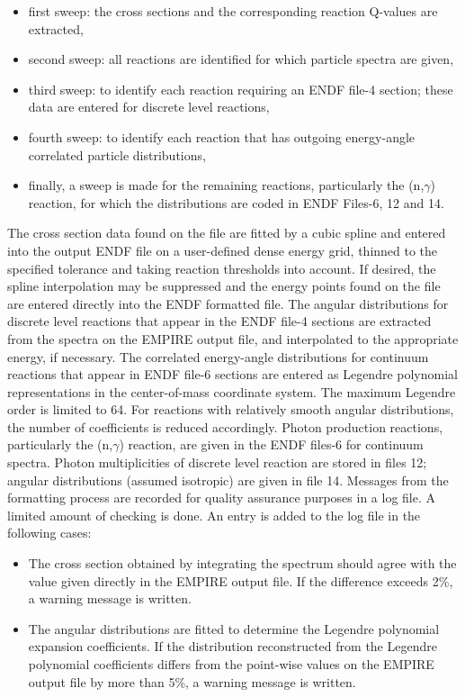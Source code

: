 \begin{itemize}
\item first sweep: the cross sections and the corresponding reaction
Q-values are extracted,

\item second sweep: all reactions are identified for which particle spectra
are given,

\item third sweep: to identify each reaction requiring an ENDF file-4
section; these data are entered for discrete level reactions,

\item fourth sweep: to identify each reaction that has outgoing energy-angle
correlated particle distributions,

\item finally, a sweep is made for the remaining reactions, particularly the
(n,$\gamma$) reaction, for which the distributions are coded in ENDF
Files-6, 12 and 14.
\end{itemize}

The cross section data found on the file are fitted by a cubic spline and
entered into the output ENDF file on a user-defined dense energy grid,
thinned to the specified tolerance and taking reaction thresholds into
account. If desired, the spline interpolation may be suppressed and the
energy points found on the file are entered directly into the ENDF formatted
file. The angular distributions for discrete level reactions that appear in
the ENDF file-4 sections are extracted from the spectra on the EMPIRE output
file, and interpolated to the appropriate energy, if necessary. The
correlated energy-angle distributions for continuum reactions that appear in
ENDF file-6 sections are entered as Legendre polynomial representations in
the center-of-mass coordinate system. The maximum Legendre order is limited
to 64. For reactions with relatively smooth angular distributions, the
number of coefficients is reduced accordingly. Photon production reactions,
particularly the (n,$\gamma$) reaction, are given in the ENDF files-6 for
continuum spectra. Photon multiplicities of discrete level reaction are
stored in files 12; angular distributions (assumed isotropic) are given in
file 14. Messages from the formatting process are recorded for quality
assurance purposes in a log file. A limited amount of checking is done. An
entry is added to the log file in the following cases:

\begin{itemize}
\item The cross section obtained by integrating the spectrum should agree
with the value given directly in the EMPIRE output file. If the difference
exceeds 2\%, a warning message is written.

\item The angular distributions are fitted to determine the Legendre
polynomial expansion coefficients. If the distribution reconstructed from
the Legendre polynomial coefficients differs from the point-wise values on
the EMPIRE output file by more than 5\%, a warning message is written.
\end{itemize}

